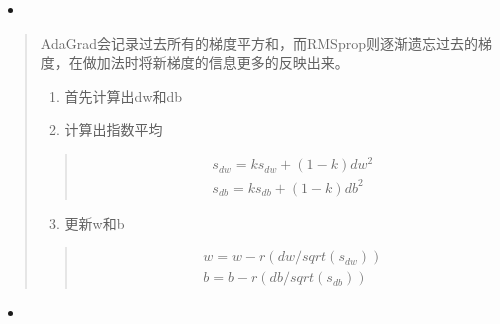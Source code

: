 \documentclass[letterpaper,10pt,english]{sphinxmanual}
\begin{document}
\begin{itemize}
\item {} 

\end{itemize}
\begin{quote}

AdaGrad会记录过去所有的梯度平方和，而RMSprop则逐渐遗忘过去的梯度，在做加法时将新梯度的信息更多的反映出来。
\begin{enumerate}
\item {} 
首先计算出dw和db

\item {} 
计算出指数平均

\end{enumerate}
\begin{quote}
\begin{equation*}
\begin{split}s_{dw} = ks_{dw} + (1-k)dw^{2}\\
s_{db} = ks_{db} + (1-k)db^{2}\end{split}
\end{equation*}\end{quote}
\begin{enumerate}
\setcounter{enumi}{2}
\item {} 
更新w和b

\end{enumerate}
\begin{quote}
\begin{equation*}
\begin{split}w = w - r(dw/sqrt(s_{dw}))\\
b = b - r(db/sqrt(s_{db}))\end{split}
\end{equation*}\end{quote}
\end{quote}
\begin{itemize}
\item {} 

\end{itemize}
\end{document}
